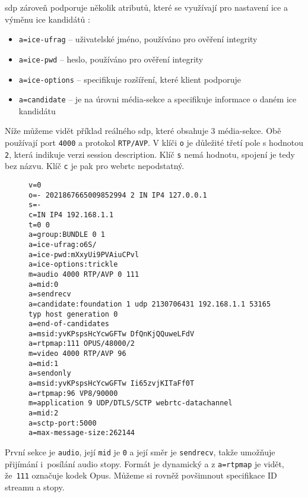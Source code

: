 \gls{sdp} zároveň podporuje několik atributů, které se využívají pro nastavení
\gls{ice} a výměnu \gls{ice} kandidátů
\parencite{WebRTCForTheCurious,IETF-RFC8839}:
\begin{itemize}
    \item \texttt{a=ice-ufrag} -- uživatelské jméno, používáno pro
          ověření integrity
    \item \texttt{a=ice-pwd} -- heslo, používáno pro ověření integrity
    \item \texttt{a=ice-options} -- specifikuje rozšíření, které
          klient podporuje
    \item \texttt{a=candidate} -- je na úrovni média-sekce a
          specifikuje informace o daném \gls{ice} kandidátu
\end{itemize}

Níže můžeme vidět příklad reálného \gls{sdp}, které obsahuje 3 média-sekce. Obě
používají port \texttt{4000} a protokol \texttt{RTP/AVP}. V
klíči \texttt{o} je důležité třetí pole s hodnotou
\texttt{2}, která indikuje verzi session description. Klíč
\texttt{s} nemá hodnotu, spojení je tedy bez názvu. Klíč
\texttt{c} je pak pro \gls{webrtc} nepodstatný.

\begin{figure}[H]
    \begin{verbatim}
v=0
o=- 2021867665009852994 2 IN IP4 127.0.0.1
s=-
c=IN IP4 192.168.1.1
t=0 0
a=group:BUNDLE 0 1
a=ice-ufrag:o6S/
a=ice-pwd:mXxyUi9PVAiuCPvl
a=ice-options:trickle
m=audio 4000 RTP/AVP 0 111
a=mid:0
a=sendrecv
a=candidate:foundation 1 udp 2130706431 192.168.1.1 53165 typ host generation 0
a=end-of-candidates
a=msid:yvKPspsHcYcwGFTw DfQnKjQQuweLFdV
a=rtpmap:111 OPUS/48000/2
m=video 4000 RTP/AVP 96
a=mid:1
a=sendonly
a=msid:yvKPspsHcYcwGFTw Ii65zvjKITaFf0T
a=rtpmap:96 VP8/90000
m=application 9 UDP/DTLS/SCTP webrtc-datachannel
a=mid:2
a=sctp-port:5000
a=max-message-size:262144
    \end{verbatim}
\end{figure}

První sekce je \texttt{audio}, její \texttt{mid} je
\texttt{0} a její směr je \texttt{sendrecv}, takže umožňuje
přijímání i~posílání audio stopy. Formát je dynamický a z
\texttt{a=rtpmap} je vidět, že~\texttt{111} označuje kodek
Opus. Můžeme si rovněž povšimnout specifikace ID streamu a stopy.

